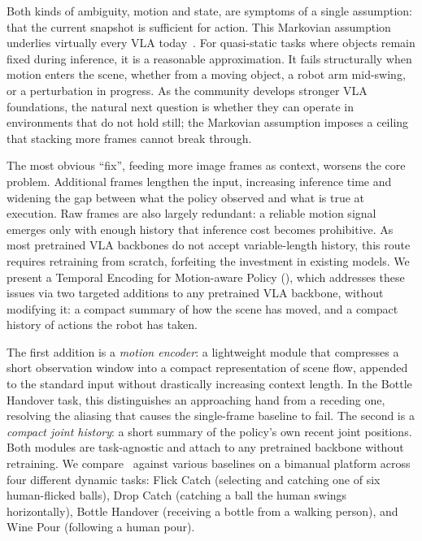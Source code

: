 Both kinds of ambiguity, motion and state, are symptoms of a single assumption: that the current snapshot is sufficient for action. This Markovian assumption underlies virtually every VLA today~\cite{pi0, pi05, openvla}. For quasi-static tasks where objects remain fixed during inference, it is a reasonable approximation. It fails structurally when motion enters the scene, whether from a moving object, a robot arm mid-swing, or a perturbation in progress. As the community develops stronger VLA foundations, the natural next question is whether they can operate in environments that do not hold still; the Markovian assumption imposes a ceiling that stacking more frames cannot break through.

The most obvious ``fix'', feeding more image frames as context, worsens the core problem. Additional frames lengthen the input, increasing inference time and widening the gap between what the policy observed and what is true at execution. Raw frames are also largely redundant: a reliable motion signal emerges only with enough history that inference cost becomes prohibitive. As most pretrained VLA backbones do not accept variable-length history, this route requires retraining from scratch, forfeiting the investment in existing models. We present a Temporal Encoding for Motion-aware Policy (\ours), which addresses these issues via two targeted additions to any pretrained VLA backbone, without modifying it: a compact summary of how the scene has moved, and a compact history of actions the robot has taken.

The first addition is a \textit{motion encoder}: a lightweight module that compresses a short observation window into a compact representation of scene flow, appended to the standard input without drastically increasing context length. In the Bottle Handover task, this distinguishes an approaching hand from a receding one, resolving the aliasing that causes the single-frame baseline to fail. The second is a \textit{compact joint history}: a short summary of the policy's own recent joint positions.  Both modules are task-agnostic and attach to any pretrained backbone without retraining.
We compare \ours\ against various baselines on a bimanual platform across four different dynamic tasks: Flick Catch (selecting and catching one of six human-flicked balls), Drop Catch (catching a ball the human swings horizontally), Bottle Handover (receiving a bottle from a walking person), and Wine Pour (following a human pour).

